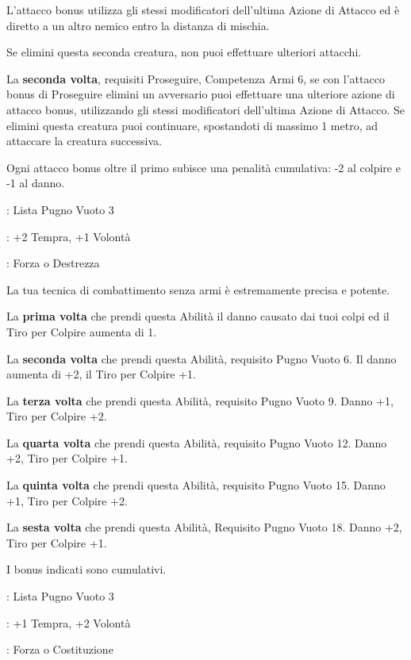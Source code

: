 \begin{multicols}{2}
L'attacco bonus utilizza gli stessi modificatori dell'ultima Azione di Attacco ed è diretto a un altro nemico entro la distanza di mischia.

Se elimini questa seconda creatura, non puoi effettuare ulteriori attacchi.

La \textbf{seconda volta}, requisiti Proseguire, Competenza Armi 6, se con l'attacco bonus di Proseguire elimini un avversario puoi effettuare una ulteriore azione di attacco bonus, utilizzando gli stessi modificatori dell'ultima Azione di Attacco. Se elimini questa creatura puoi continuare, spostandoti di massimo 1 metro, ad attaccare la creatura successiva.

Ogni attacco bonus oltre il primo subisce una penalità cumulativa: -2 al colpire e -1 al danno.

\begin{description}[noitemsep, topsep=0pt, parsep=0pt, partopsep=0pt, leftmargin=0cm, labelwidth=2.5cm]
    \item[\textbf{Requisito}]: Lista Pugno Vuoto 3
    \item[\textbf{Tiri Salvezza}]: +2 Tempra, +1 Volontà
    \item[\textbf{Caratteristica}]: Forza o Destrezza
\end{description}

La tua tecnica di combattimento senza armi è estremamente precisa e potente.

La \textbf{prima volta} che prendi questa Abilità il danno causato dai tuoi colpi ed il Tiro per Colpire aumenta di 1.

La \textbf{seconda volta} che prendi questa Abilità, requisito Pugno Vuoto 6. Il danno aumenta di +2, il Tiro per Colpire +1.

La \textbf{terza volta} che prendi questa Abilità, requisito Pugno Vuoto 9. Danno +1, Tiro per Colpire +2.

La \textbf{quarta volta} che prendi questa Abilità, requisito Pugno Vuoto 12. Danno +2, Tiro per Colpire +1.

La \textbf{quinta volta} che prendi questa Abilità, requisito Pugno Vuoto 15. Danno +1, Tiro per Colpire +2.

La \textbf{sesta volta} che prendi questa Abilità, Requisito Pugno Vuoto 18. Danno +2, Tiro per Colpire +1.

I bonus indicati sono cumulativi.

\begin{description}[noitemsep, topsep=0pt, parsep=0pt, partopsep=0pt, leftmargin=0cm, labelwidth=2.5cm]
    \item[\textbf{Requisito}]: Lista Pugno Vuoto 3
    \item[\textbf{Tiri Salvezza}]: +1 Tempra, +2 Volontà
    \item[\textbf{Caratteristica}]: Forza o Costituzione
\end{description}


\end{multicols}
